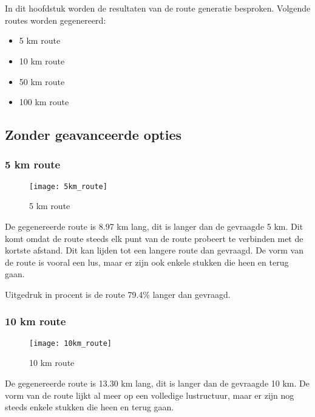 \chapter{}%
\label{ch:resultaten}

In dit hoofdstuk worden de resultaten van de route generatie besproken. 
Volgende routes worden gegenereerd:
\begin{itemize}
    \item 5 km route
    \item 10 km route
    \item 50 km route
    \item 100 km route
\end{itemize}
\section{Zonder geavanceerde opties}

\subsection{5 km route}

\begin{figure}[H]
    \centering
    \texttt{[image: 5km\_route]}
    \caption{5 km route}
    \label{fig:5km_route}

\end{figure}

De gegenereerde route is 8.97 km lang, dit is langer dan de gevraagde 5 km. Dit komt omdat de route steeds elk punt van de route probeert te verbinden met de kortste afstand. Dit kan lijden tot een langere route dan gevraagd.
De vorm van de route is vooral een lus, maar er zijn ook enkele stukken die heen en terug gaan.

Uitgedruk in procent is de route 79.4\% langer dan gevraagd.
\subsection{10 km route}

\begin{figure}[H]
    \centering
    \texttt{[image: 10km\_route]}
    \caption{10 km route}
    \label{fig:10km_route}

\end{figure}

De gegenereerde route is 13.30 km lang, dit is langer dan de gevraagde 10 km. De vorm van de route lijkt al meer op een volledige lustructuur, maar er zijn nog steeds enkele stukken die heen en terug gaan.


